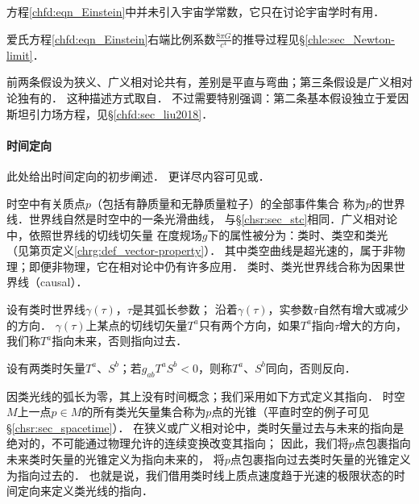 方程\eqref{chfd:eqn_Einstein}中并未引入宇宙学常数，它只在讨论宇宙学时有用．

爱氏方程\eqref{chfd:eqn_Einstein}右端比例系数$\frac{8\pi G}{c^4}$的推导过程见\S\ref{chle:sec_Newton-limit}．

\begin{remark}
    前两条假设为狭义、广义相对论共有，差别是平直与弯曲；第三条假设是广义相对论独有的．    
    这种描述方式取自\textcite[Ch.3]{hawking-ellis1973}．
    不过需要特别强调：第二条基本假设独立于爱因斯坦引力场方程，见\S\ref{chfd:sec_liu2018}．
\end{remark}


%


\paragraph{时间定向}
此处给出时间定向的初步阐述．
更详尽内容可见\parencite[\S 6.1]{hawking-ellis1973}或\parencite[p.143]{oneill1983}．

时空中有关质点$p$（包括有静质量和无静质量粒子）的全部事件集合
称为$p$的{\heiti 世界线}．世界线自然是时空中的一条光滑曲线，
与\S\ref{chsr:sec_stc}相同．广义相对论中，依照世界线的切线切矢量
在度规场$g$下的属性被分为：类时、类空和类光
（见第\pageref{chrg:def_vector-property}页定义\ref{chrg:def_vector-property}）．
其中类空曲线是超光速的，属于非物理；即便非物理，它在相对论中仍有许多应用．
类时、类光世界线合称为{\heiti 因果世界线}（causal）．

设有类时世界线$\gamma(\tau)$，$\tau$是其弧长参数；
沿着$\gamma(\tau)$，实参数$\tau$自然有增大或减少的方向．
$\gamma(\tau)$上某点的切线切矢量$T^a$只有两个方向，如果$T^a$指向$\tau$增大的方向，
我们称$T^a${\heiti 指向未来}，否则{\heiti 指向过去}．

设有两类时矢量$T^a$、$S^b$；若$g_{ab}T^a S^b <0$，则称$T^a$、$S^b${\heiti 同向}，否则{\heiti 反向}．


因类光线的弧长为零，其上没有时间概念；我们采用如下方式定义其指向．
时空$M$上一点$p\in M$的所有类光矢量集合称为$p$点的{\heiti 光锥}（平直时空的例子可见\S\ref{chsr:sec_spacetime}）．
在狭义或广义相对论中，类时矢量过去与未来的指向是绝对的，不可能通过物理允许的连续变换改变其指向；
因此，我们将$p$点包裹指向未来类时矢量的光锥定义为{\heiti 指向未来}的，
将$p$点包裹指向过去类时矢量的光锥定义为{\heiti 指向过去}的．
也就是说，我们借用类时线上质点速度趋于光速的极限状态的时间定向来定义类光线的指向．




